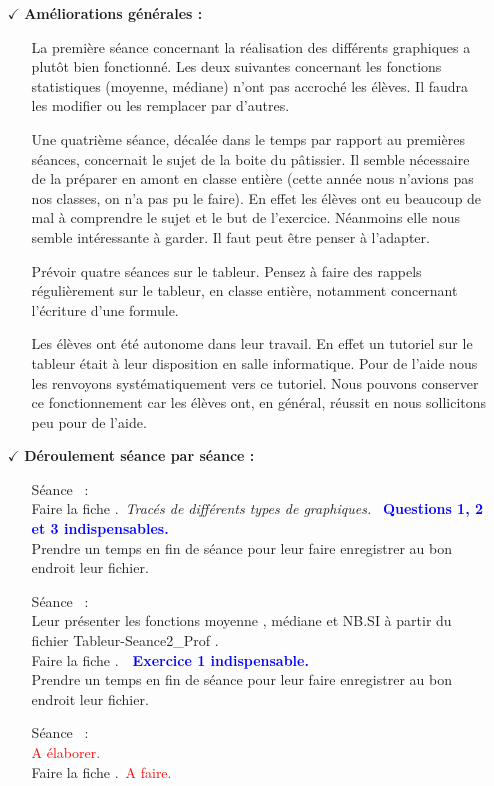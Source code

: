 \documentclass[12pt,a4paper]{article} %
\newcounter{num}
\newcommand{\seance}{\stepcounter{num} Séance \thenum \, : \\}
\newcounter{fiche}
\newcommand{\fiche}{\stepcounter{fiche} Faire la fiche \thefiche. \,}
\begin{document}
\begin{itemize}
\item[$\checkmark$]
\textbf{Améliorations générales :}
\begin{itemize}
\item[\textbullet]
La première séance concernant la réalisation des différents graphiques a plutôt bien fonctionné. Les deux suivantes concernant les fonctions statistiques (moyenne, médiane) n'ont pas accroché les élèves. Il faudra les modifier ou les remplacer par d'autres. \vspace{3pt}
\item[\textbullet]
Une quatrième séance, décalée dans le temps par rapport au premières séances, concernait le sujet de la boite du pâtissier. Il semble nécessaire de la préparer en amont en classe entière (cette année nous n'avions pas nos classes, on n'a pas pu le faire). En effet les élèves ont eu beaucoup de mal à comprendre le sujet et le but de l'exercice. Néanmoins elle nous semble intéressante à garder. Il faut peut être penser à l'adapter. \vspace{3pt}
\item[\textbullet]
Prévoir quatre séances sur le tableur. Pensez à faire des rappels régulièrement sur le tableur, en classe entière, notamment concernant l'écriture d'une formule.\vspace{3pt}
\item[\textbullet]
Les élèves ont été autonome dans leur travail. En effet un tutoriel sur le tableur était à leur disposition en salle informatique. Pour de l'aide nous les renvoyons systématiquement vers ce tutoriel. Nous pouvons conserver ce fonctionnement car les élèves ont, en général, réussit en nous sollicitons peu pour de l'aide.
\end{itemize}
\vspace{24pt}
\setcounter{num}{0}
\setcounter{fiche}{0}
\item[$\checkmark$]
\textbf{Déroulement séance par séance :}
\begin{itemize}
\item[\textbullet]
\seance
\fiche \textit{Tracés de différents types de graphiques.} \, \textcolor{blue}{\textbf{Questions 1, 2 et 3 indispensables.}} \\
Prendre un temps en fin de séance pour leur faire enregistrer au bon endroit leur fichier. \vspace{3pt}
\item[\textbullet]
\seance
Leur présenter les fonctions \og moyenne \fg{}, \og médiane \fg{} et \og NB.SI \fg{} à partir du fichier \og Tableur-Seance2\_Prof \fg{}. \\
\fiche \, \textcolor{blue}{\textbf{Exercice 1 indispensable.}} \\
Prendre un temps en fin de séance pour leur faire enregistrer au bon endroit leur fichier. \vspace{3pt}
\item[\textbullet]
\seance \textcolor{red}{A élaborer.} \\
\fiche \textcolor{red}{A faire.}


\end{itemize}
\end{itemize}
\end{document}
